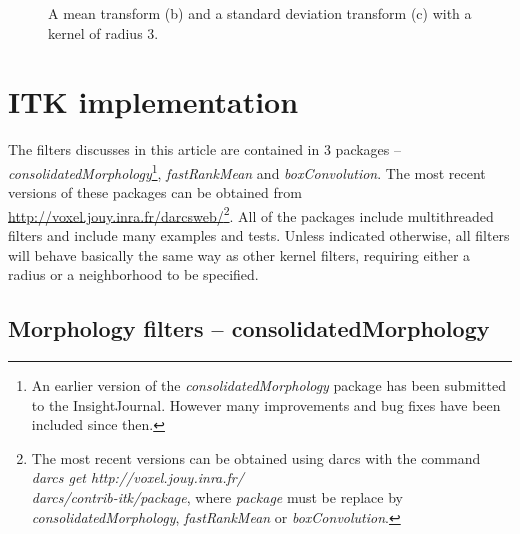 \documentclass{InsightArticle}
\begin{document}
\begin{figure}[htbp]
\begin{center}
\caption{A mean transform (b) and a standard deviation transform (c) with a kernel of radius 3.}
\end{center}
\end{figure}


\section{ITK implementation}
The filters discusses in this article are contained in 3 packages --
{\em consolidatedMorphology}\footnote{An earlier version of the {\em consolidatedMorphology} package has
been submitted to the InsightJournal. However many improvements and
bug fixes have been included since then.}, {\em fastRankMean} and {\em
boxConvolution}. The most recent versions of these packages can be
obtained from \url{http://voxel.jouy.inra.fr/darcsweb/}\footnote{
The most recent versions can be obtained using darcs \cite{DarcsWebSite}
with the command {\em darcs get http://voxel.jouy.inra.fr/\\darcs/contrib-itk/package},
where {\em package} must be replace by {\em consolidatedMorphology},
{\em fastRankMean} or {\em boxConvolution}.}.
All of the packages
include multithreaded filters and include many examples and tests. Unless
indicated otherwise, all filters will behave basically the same way as
other kernel filters, requiring either a radius or a neighborhood to
be specified.

\subsection{Morphology filters -- consolidatedMorphology}
\end{document}
